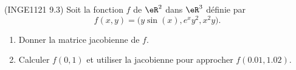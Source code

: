 
\begin{exercice}\label{exoFoncDeuxVar0021}

	(INGE1121 9.3) Soit la fonction $f$ de $\eR^2$ dans $\eR^3$ définie par
	\begin{equation}
		f(x,y)=\big( y\sin(x), e^{x}y^2,x^2y \big).
	\end{equation}
	\begin{enumerate}

		\item
			Donner la matrice jacobienne de $f$.
		\item
			Calculer $f(0,1)$ et utiliser la jacobienne pour approcher $f(0.01,1.02)$.

	\end{enumerate}

\end{exercice}
